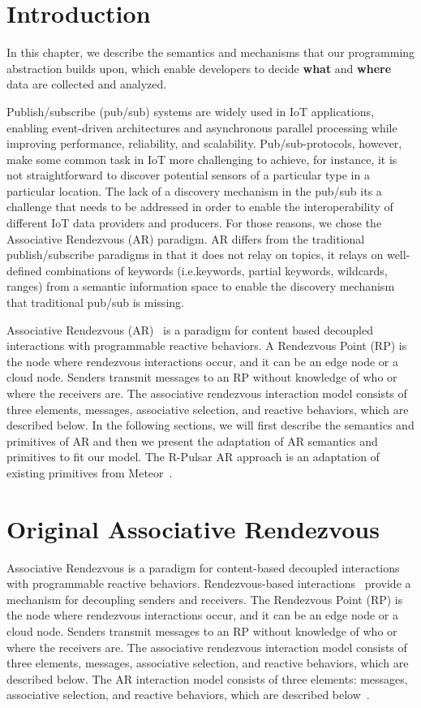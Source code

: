 \section{Introduction}

In this chapter, we describe the semantics and mechanisms that our programming abstraction builds upon, which enable developers to decide \textbf{what} and \textbf{where} data are collected and analyzed. 

Publish/subscribe (pub/sub) systems are widely used in IoT applications, enabling event-driven architectures and asynchronous parallel processing while improving performance, reliability, and scalability. Pub/sub-protocols, however, make some common task in IoT more challenging to achieve, for instance, it is not straightforward to discover potential sensors of a particular type in a particular location. The lack of a discovery mechanism in the pub/sub its a challenge that needs to be addressed in order to enable the interoperability of different IoT data providers and producers. For those reasons, we chose the Associative Rendezvous (AR) paradigm. AR differs from the traditional publish/subscribe paradigms in that it does not relay on topics, it relays on well-defined combinations of keywords (i.e.keywords, partial keywords, wildcards, ranges) from a semantic information space to enable the discovery mechanism that traditional pub/sub is missing.

Associative Rendezvous (AR)~\cite{AR} is a paradigm for content based decoupled interactions with programmable reactive behaviors. A Rendezvous Point (RP) is the node where rendezvous interactions occur, and it can be an edge node or a cloud node. Senders transmit messages to an RP without knowledge of who or where the receivers are. The associative rendezvous interaction model consists of three elements, messages, associative selection, and reactive behaviors, which are described below. In the following sections, we will first describe the semantics and primitives of AR and then we present the adaptation of AR semantics and primitives to fit our model. The R-Pulsar AR approach is an adaptation of existing primitives from Meteor~\cite{meteor2008}.

\section{Original Associative Rendezvous} 
Associative Rendezvous is a paradigm for content-based decoupled interactions with programmable reactive behaviors. Rendezvous-based interactions~\cite{AR} provide a mechanism for decoupling senders and receivers. The Rendezvous Point (RP) is the node where rendezvous interactions occur, and it can be an edge node or a cloud node. Senders transmit messages to an RP without knowledge of who or where the receivers are. The associative rendezvous interaction model consists of three elements, messages, associative selection, and reactive behaviors, which are described below. The AR interaction model consists of three elements: messages, associative selection, and reactive behaviors, which are described below~\cite{meteor2008}.

